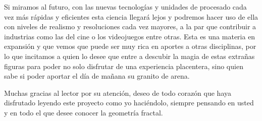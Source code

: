 Si miramos al futuro, con las nuevas tecnologías y unidades de procesado cada vez más rápidas y eficientes esta ciencia llegará lejos y podremos hacer uso de ella con niveles de realismo y resoluciones cada vez mayores, a la par que contribuir a industrias como las del cine o los videojuegos entre otras. Esta es una materia en expansión y que vemos que puede ser muy rica en aportes a otras disciplinas, por lo que incitamos a quien lo desee que entre a descubir la magia de estas extrañas figuras para poder no solo disfrutar de una experiencia placentera, sino quien sabe si poder aportar el día de mañana su granito de arena.

Muchas gracias al lector por su atención, deseo de todo corazón que haya disfrutado leyendo este proyecto como yo haciéndolo, siempre pensando en usted y en todo el que desee conocer la geometría fractal. 

